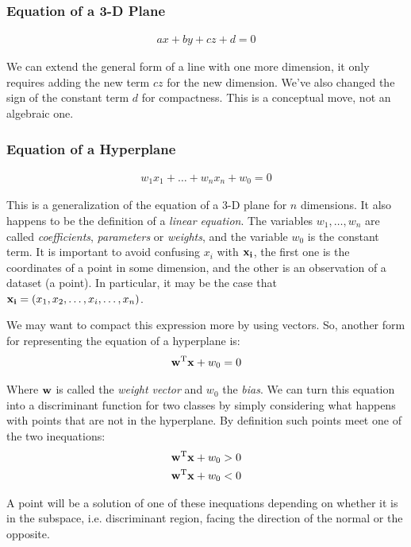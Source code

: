 \subsubsection*{Equation of a 3-D Plane}
\begin{align}
    ax + by + cz + d = 0
\end{align}

We can extend the general form of a line with one more dimension, it only requires adding the new term $cz$ for the new dimension. We've also changed the sign of the constant term $d$ for compactness. This is a conceptual move, not an algebraic one.

\subsubsection*{Equation of a Hyperplane}
\begin{align}
    w_1x_1 + \dots + w_nx_n + w_0 = 0
\end{align}

This is a generalization of the equation of a 3-D plane for $n$ dimensions. It also happens to be the definition of a \emph{linear equation}. The variables $w_1, \dots, w_n$ are called \emph{coefficients}, \emph{parameters} or \emph{weights}, and the variable $w_0$ is the constant term. It is important to avoid confusing $x_i$ with $\mathbf{x_i}$, the first one is the coordinates of a point in some dimension, and the other is an observation of a dataset (a point). In particular, it may be the case that $\mathbf{x_i} = (x_1, x_2, \dots, x_i, \dots, x_n)$.

We may want to compact this expression more by using vectors. So, another form for representing the equation of a hyperplane is:
\begin{align}
    \mathbf{w}^{\text{T}}\mathbf{x} + w_0 = 0
\end{align}

Where $\mathbf{w}$ is called the \emph{weight vector} and $w_0$ the \emph{bias}. We can turn this equation into a discriminant function for two classes by simply considering what happens with points that are not in the hyperplane. By definition such points meet one of the two inequations:
\begin{align*}
    \mathbf{w}^{\text{T}}\mathbf{x} + w_0 > 0 \\
    \mathbf{w}^{\text{T}}\mathbf{x} + w_0 < 0
\end{align*}

A point will be a solution of one of these inequations depending on whether it is in the subspace, i.e. discriminant region, facing the direction of the normal or the opposite.

